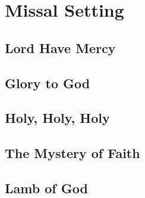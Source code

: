 \documentclass[a5paper,twoside]{article}
\begin{document}
\section*{Missal Setting}
\subsection*{Lord Have Mercy}
\kyrie

\subsection*{Glory to God}
\gloria

\subsection*{Holy, Holy, Holy}
\sanctus

\subsection*{The Mystery of Faith}
\mortem

\subsection*{Lamb of God}
\agnusdei
\end{document}
